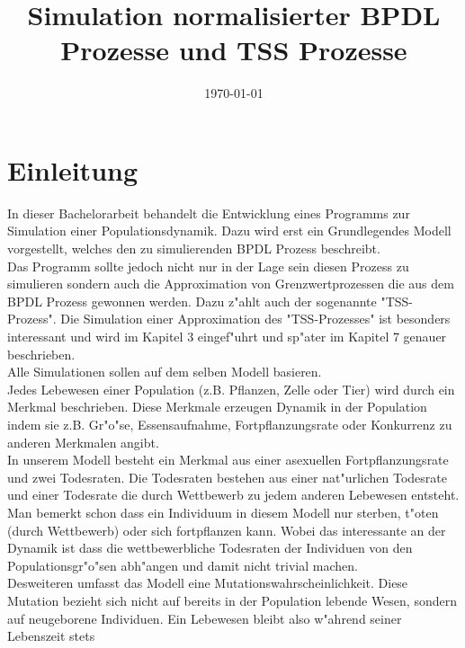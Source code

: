 \documentclass[11pt, a4paper, german]{article}
\date{\today}
\title{Simulation normalisierter BPDL Prozesse und TSS Prozesse}
\theoremstyle{plain}
\begin{document}
\maketitle
\setcounter{tocdepth}{2}
\tableofcontents


\clearpage
\section{Einleitung}
In dieser Bachelorarbeit behandelt die Entwicklung eines Programms zur Simulation einer Populationsdynamik. Dazu wird erst ein Grundlegendes Modell vorgestellt, welches den zu simulierenden BPDL Prozess beschreibt.\\
Das Programm sollte jedoch nicht nur in der Lage sein diesen Prozess zu simulieren sondern auch die Approximation von Grenzwertprozessen die aus dem BPDL Prozess gewonnen werden. Dazu z"ahlt auch der sogenannte "{}TSS-Prozess"{}. Die Simulation einer Approximation des "{}TSS-Prozesses"{} ist besonders interessant und wird im Kapitel 3 eingef"uhrt und sp"ater im Kapitel 7 genauer beschrieben.\\
Alle Simulationen sollen auf dem selben Modell basieren.\\
Jedes Lebewesen einer Population (z.B. Pflanzen, Zelle oder Tier) wird durch ein Merkmal beschrieben. Diese Merkmale erzeugen Dynamik in der Population indem sie z.B. Gr"o"se, Essensaufnahme, Fortpflanzungsrate oder Konkurrenz zu anderen Merkmalen angibt.\\
In unserem Modell besteht ein Merkmal aus einer asexuellen Fortpflanzungsrate und zwei Todesraten. Die Todesraten bestehen aus einer nat"urlichen Todesrate und einer Todesrate die durch Wettbewerb zu jedem anderen Lebewesen entsteht. Man bemerkt schon dass ein Individuum in diesem Modell nur sterben, t"oten (durch Wettbewerb) oder sich fortpflanzen kann. Wobei das interessante an der Dynamik ist dass die wettbewerbliche Todesraten der Individuen von den Populationsgr"o"sen abh"angen und damit nicht trivial machen.\\
Desweiteren umfasst das Modell eine Mutationswahrscheinlichkeit. Diese Mutation bezieht sich nicht auf bereits in der Population lebende Wesen, sondern auf neugeborene Individuen. Ein Lebewesen bleibt also w"ahrend seiner Lebenszeit stets
\end{document}
